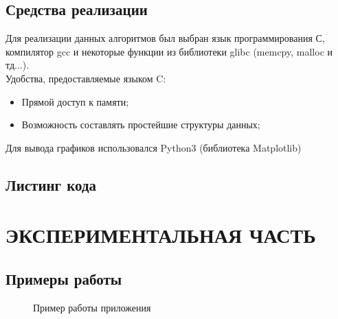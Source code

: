 \documentclass[a4paper,12pt]{article}
\begin{document}
\newpage
\subsection{Средства реализации}
Для реализации данных алгоритмов был выбран язык программирования С, компилятор
gcc и некоторые функции из библиотеки glibc (memcpy, malloc и тд...). \\
Удобства, предоставляемые языком C:
\begin{itemize}
\item Прямой доступ к памяти;
\item Возможность составлять простейшие структуры данных;
\end{itemize}
Для вывода графиков использовался Python3 (библиотека Matplotlib)

\newpage
\subsection{Листинг кода}




\newpage
\section{ЭКСПЕРИМЕНТАЛЬНАЯ ЧАСТЬ}

\subsection{Примеры работы}
\begin{figure}[h]
\caption{Пример работы приложения}
\label{images:example}
\end{figure}
\end{document}
